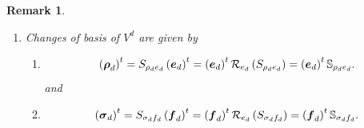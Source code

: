 \documentclass[aps,preprint]{revtex4}
\newtheorem{remark}[theorem]{Remark}
\begin{document}
\begin{remark}
\begin{enumerate}
\begin{enumerate}
\begin{gather}
{\begin{array}{ccc}
_{e_{d}}\left( \rho _{dr}\right) _{1} \\ 
\vdots & \ddots & \vdots \\ 
\mathcal{R}_{e_{d}}\left( \rho _{d1}\right) _{r} & \cdots & \mathcal{R}%
_{e_{d}}\left( \rho _{dr}\right) _{r}%
\end{array}%
\right) \otimes \left( 
\begin{array}{ccc}
\mathcal{R}_{f_{d}}\left( \sigma _{d1}\right) _{1} & \cdots & \mathcal{R}%
_{f_{d}}\left( \sigma _{dr}\right) _{1} \\ 
\vdots & \ddots & \vdots \\ 
\mathcal{R}_{f_{d}}\left( \sigma _{d1}\right) _{r} & \cdots & \mathcal{R}%
_{f_{d}}\left( \sigma _{dr}\right) _{r}%
\end{array}%
\right) }\right) \\
\parallel \\
\left( 
\begin{array}{ccc}
e_{d1}\otimes f_{d1} & \cdots & e_{dr}\otimes f_{dr}%
\end{array}%
\right) \left( 
\begin{array}{ccc}
\mathcal{R}_{e_{d}f_{d}}\left( T_{d\rho \sigma }\right) _{1111} & \cdots & 
\mathcal{R}_{e_{d}f_{d}}\left( T_{d\rho \sigma }\right) _{111rr} \\ 
\vdots & \ddots & \vdots \\ 
\mathcal{R}_{e_{d}f_{d}}\left( T_{d\rho \sigma }\right) _{rr11} & \cdots & 
\mathcal{R}_{e_{d}f_{d}}\left( T_{d\rho \sigma }\right) _{rrrr}%
\end{array}%
\right) .
\end{gather}

\item Changes of basis of $V^{d}$ are given by

\begin{enumerate}
\item 
\begin{equation}
\left( \boldsymbol{\rho }_{d}\right) ^{t}=S_{\rho _{d}e_{d}}\left( 
\boldsymbol{e}_{d}\right) ^{t}=\left( \boldsymbol{e}_{d}\right) ^{t}\mathcal{%
R}_{e_{d}}\left( S_{\rho _{d}e_{d}}\right) =\left( \boldsymbol{e}_{d}\right)
^{t}\mathbb{S}_{\rho _{d}e_{d}}.
\end{equation}%
and

\item 
\begin{equation}
\left( \boldsymbol{\sigma }_{d}\right) ^{t}=S_{\sigma _{d}f_{d}}\left( 
\boldsymbol{f}_{d}\right) ^{t}=\left( \boldsymbol{f}_{d}\right) ^{t}\mathcal{%
R}_{e_{d}}\left( S_{\sigma _{d}f_{d}}\right) =\left( \boldsymbol{f}%
_{d}\right) ^{t}\mathbb{S}_{\sigma _{d}f_{d}}.
\end{equation}
\end{enumerate}


\end{enumerate}
\end{enumerate}
\end{remark}
\end{document}
